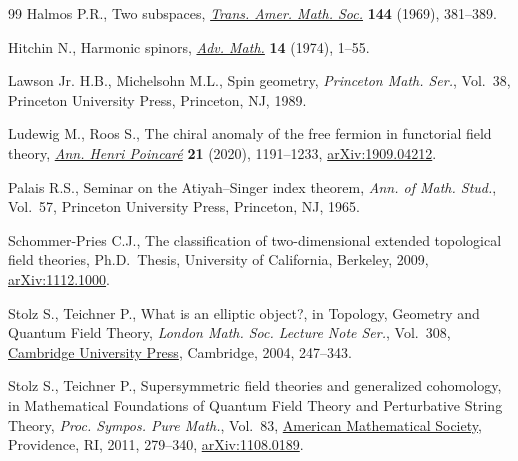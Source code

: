 \begin{thebibliography}{99}
Halmos P.R., Two subspaces, \href{https://doi.org/10.2307/1995288}{\textit{Trans. Amer. Math. Soc.}} \textbf{144}
 (1969), 381--389.

Hitchin N., Harmonic spinors, \href{https://doi.org/10.1016/0001-8708(74)90021-8}{\textit{Adv. Math.}} \textbf{14} (1974), 1--55.

Lawson Jr. H.B., Michelsohn M.L., Spin geometry, \textit{Princeton Math. Ser.},
 Vol.~38, Princeton University Press, Princeton, NJ, 1989.

Ludewig M., Roos S., The chiral anomaly of the free fermion in functorial field
 theory, \href{https://doi.org/10.1007/s00023-020-00893-6}{\textit{Ann. Henri Poincar\'e}} \textbf{21} (2020), 1191--1233,
 \href{https://arxiv.org/abs/1909.04212}{arXiv:1909.04212}.

Palais R.S., Seminar on the {A}tiyah--{S}inger index theorem, \textit{Ann. of
 Math. Stud.}, Vol.~57, Princeton University Press, Princeton, NJ, 1965.

Schommer-Pries C.J., The classification of two-dimensional extended topological
 field theories, Ph.D.~Thesis, {U}niversity of {C}alifornia, Berkeley, 2009,
 \href{https://arxiv.org/abs/1112.1000}{arXiv:1112.1000}.

Stolz S., Teichner P., What is an elliptic object?, in Topology, {G}eometry and
 {Q}uantum {F}ield {T}heory, \textit{London Math. Soc. Lecture Note Ser.},
 Vol.~308, \href{https://doi.org/10.1017/CBO9780511526398.013}{Cambridge University Press}, Cambridge, 2004, 247--343.

Stolz S., Teichner P., Supersymmetric field theories and generalized
 cohomology, in Mathematical {F}oundations of {Q}uantum {F}ield {T}heory and
 {P}erturbative {S}tring {T}heory, \textit{Proc. Sympos. Pure Math.}, Vol.~83,
 \href{https://doi.org/10.1090/pspum/083/2742432}{American Mathematical Society}, Providence, RI, 2011, 279--340,
 \href{https://arxiv.org/abs/1108.0189}{arXiv:1108.0189}.

\end{thebibliography}
